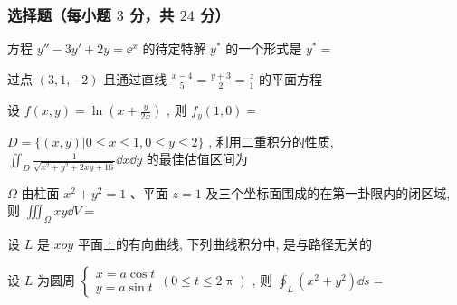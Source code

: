\subsubsection{选择题（每小题 $3$ 分，共 $24$ 分）}
\begin{ti}
	方程 $y''-3 y'+2 y=\ee^{x}$ 的待定特解 $y^*$ 的一个形式是 $y^*=$ \kuo
\end{ti}

\begin{ti}
	过点 $(3,1,-2)$ 且通过直线 $\frac{x-4}{5}=\frac{y+3}{2}=\frac{z}{1}$ 的平面方程 \kuo
\end{ti}

\begin{ti}
	设 $f(x,y)=\ln\left(x+\frac{y}{2x} \right)$ , 则 $f_{y}(1,0)=$ \kuo
\end{ti}

\begin{ti}
	$D=\{ (x,y)|0\leqslant x\leqslant 1,0\leqslant y\leqslant 2 \}$ , 利用二重积分的性质, $\iint_{D}\frac{1}{\sqrt{x^2+y^2+2xy+16}}\dd{x}\dd{y}$ 的最佳估值区间为 \kuo
\end{ti}

\begin{ti}
	$\Omega$ 由柱面 $x^2+y^2=1$ 、平面 $z=1$ 及三个坐标面围成的在第一卦限内的闭区域, 则 $\iiint_{\Omega}xy\dd{V}=$ \kuo
\end{ti}

\begin{ti}
	设 $L$ 是 $xoy$ 平面上的有向曲线, 下列曲线积分中, \kuo 是与路径无关的
\end{ti}

\begin{ti}
	设 $L$ 为圆周 $\begin{cases}
		x=a\cos t\\
		y=a\sin t
	\end{cases}(0\leqslant t\leqslant 2\uppi)$ , 则 $\oint_{L}\left(x^{2}+y^{2}\right) \dd{s}=$ \kuo
\end{ti}


